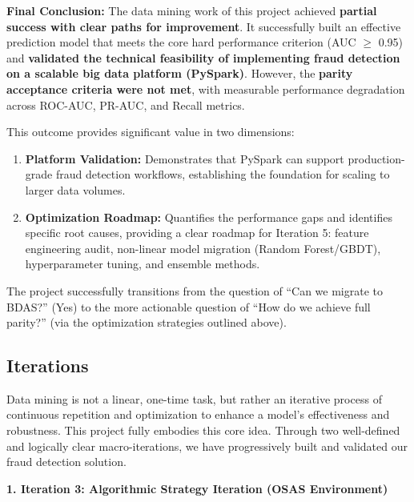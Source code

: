 \documentclass[sigplan,screen]{acmart}
\begin{document}
\textbf{Final Conclusion:} The data mining work of this project achieved \textbf{partial success with clear paths for improvement}. It successfully built an effective prediction model that meets the core hard performance criterion (AUC $\geq$ 0.95) and \textbf{validated the technical feasibility of implementing fraud detection on a scalable big data platform (PySpark)}. However, the \textbf{parity acceptance criteria were not met}, with measurable performance degradation across ROC-AUC, PR-AUC, and Recall metrics.

This outcome provides significant value in two dimensions:

\begin{enumerate}
\item \textbf{Platform Validation:} Demonstrates that PySpark can support production-grade fraud detection workflows, establishing the foundation for scaling to larger data volumes.
\item \textbf{Optimization Roadmap:} Quantifies the performance gaps and identifies specific root causes, providing a clear roadmap for Iteration 5: feature engineering audit, non-linear model migration (Random Forest/GBDT), hyperparameter tuning, and ensemble methods.
\end{enumerate}

The project successfully transitions from the question of ``Can we migrate to BDAS?'' (Yes) to the more actionable question of ``How do we achieve full parity?'' (via the optimization strategies outlined above).

\subsection{Iterations}

Data mining is not a linear, one-time task, but rather an iterative process of continuous repetition and optimization to enhance a model's effectiveness and robustness. This project fully embodies this core idea. Through two well-defined and logically clear macro-iterations, we have progressively built and validated our fraud detection solution.

\textbf{1. Iteration 3: Algorithmic Strategy Iteration (OSAS Environment)}
\end{document}
